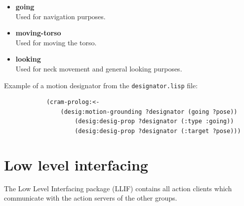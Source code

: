 \documentclass[main.tex]{subfiles}
\begin{document}
        \begin{itemize}
        \label{desig}
            \item \textbf{going} \\
        Used for navigation purposes.
        \item \textbf{moving-torso} \\
        Used for moving the torso.
        \item \textbf{looking} \\
        Used for neck movement and general looking purposes.
        \end{itemize}
        Example of a motion designator from the \texttt{designator.lisp} file:
        \begin{lstlisting}
            (cram-prolog:<- 
                (desig:motion-grounding ?designator (going ?pose))
                    (desig:desig-prop ?designator (:type :going))
                    (desig:desig-prop ?designator (:target ?pose)))
        \end{lstlisting}

          \section{Low level interfacing}
          \label{llif}
        The Low Level Interfacing package (LLIF) contains all action clients which communicate with the action servers of the other groups.
\end{document}
